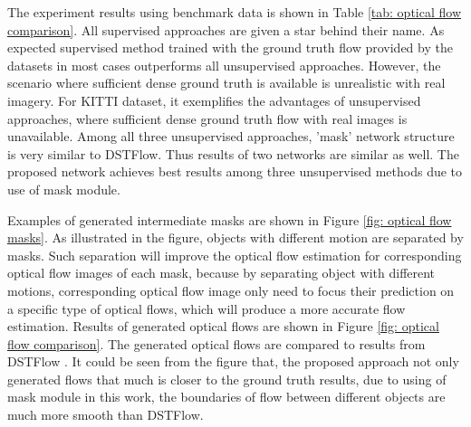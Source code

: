 \documentclass{iitthesis}
\begin{document}
The experiment results using benchmark data is shown in Table \ref{tab: optical flow comparison}. All supervised approaches are given a star behind their name. As expected supervised method trained with the ground truth flow provided by the datasets in most cases outperforms all unsupervised approaches. However, the scenario where sufficient dense ground truth is available is unrealistic with real imagery. For KITTI dataset, it exemplifies the advantages of unsupervised approaches, where sufficient dense ground truth flow with real images is unavailable. Among all three unsupervised approaches, 'mask' network structure is very similar to DSTFlow. Thus results of two networks are similar as well. The proposed network achieves best results among three unsupervised methods due to use of mask module. 



Examples of generated intermediate masks are shown in Figure \ref{fig: optical flow masks}. As illustrated in the figure, objects with different motion are separated by masks. Such separation will improve the optical flow estimation for corresponding optical flow images of each mask, because by separating object with different motions, corresponding optical flow image only need to focus their prediction on a specific type of optical flows, which will produce a more accurate flow estimation. Results of generated optical flows are shown in Figure \ref{fig: optical flow comparison}. The generated optical flows are compared to results from DSTFlow \cite{ren2017unsupervised}. It could be seen from the figure that, the proposed approach not only generated flows that much is closer to the ground truth results, due to using of mask module in this work, the boundaries of flow between different objects are much more smooth than DSTFlow.
\end{document}
